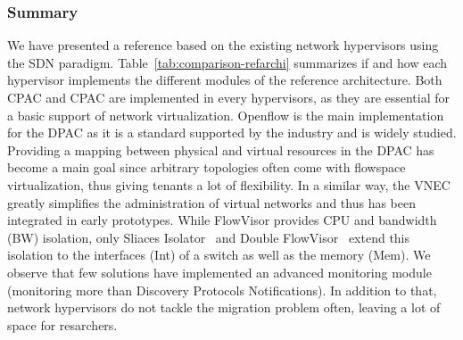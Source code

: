 \subsubsection{Summary}
We have presented a reference based on the existing network hypervisors using the SDN paradigm.
Table~\ref{tab:comparison-refarchi} summarizes if and how each hypervisor implements the different modules of the reference architecture.
Both CPAC and CPAC are implemented in every hypervisors, as they are essential for a basic support of network virtualization.
Openflow is the main implementation for the DPAC as it is a standard supported by the industry and is widely studied.
Providing a mapping between physical and virtual resources in the DPAC has become a main goal since arbitrary topologies often come with flowspace virtualization, thus giving tenants a lot of flexibility.
In a similar way, the VNEC greatly simplifies the administration of virtual networks and thus has been integrated in early prototypes.
While FlowVisor provides CPU and bandwidth (BW) isolation, only Sliaces Isolator~\cite{SlicesIsolator-El-Azzab2011} and Double FlowVisor~\cite{DoubleFV-Yin2013} extend this isolation to the interfaces (Int) of a switch as well as the memory (Mem).
We observe that few solutions have implemented an advanced monitoring module (\ie monitoring more than Discovery Protocols Notifications).
In addition to that, network hypervisors do not tackle the migration problem often, leaving a lot of space for resarchers.


